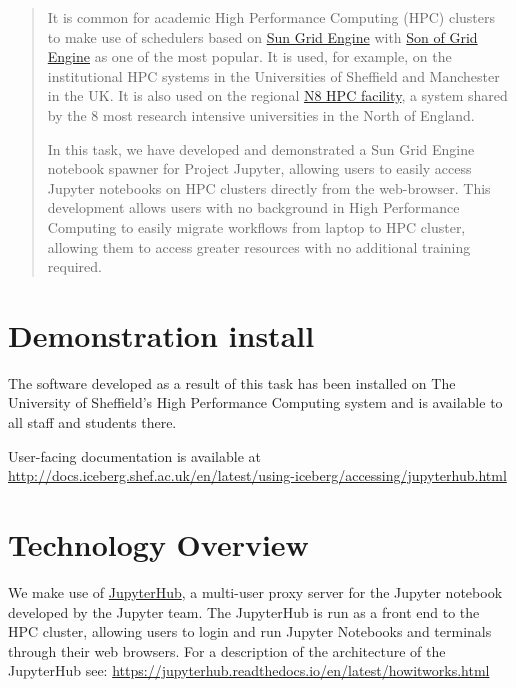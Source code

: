 \documentclass{deliverablereport}
\author{Stuart Mumford, Neil Lawrence \& Mike Croucher}
\begin{document}
\begin{abstract}
It is common for academic High Performance Computing (HPC) clusters to make use of schedulers based on \href{https://en.wikipedia.org/wiki/Oracle_Grid_Engine}{Sun Grid Engine} with \href{https://arc.liv.ac.uk/trac/SGE}{Son of Grid Engine} as one of the most popular. It is used, for example, on the institutional HPC systems in the Universities of Sheffield and Manchester in the UK. It is also used on the regional \href{http://n8hpc.org.uk/}{N8 HPC facility}, a system shared by the 8 most research intensive universities in the North of England. 

In this task, we have developed and demonstrated a Sun Grid Engine notebook spawner for Project Jupyter, allowing users to easily access Jupyter notebooks on HPC clusters directly from the web-browser. This development allows users with no background in High Performance Computing to easily migrate workflows from laptop to HPC cluster, allowing them to access greater resources with no additional training required.

\end{abstract}
\maketitle\vfill
\newpage\tableofcontents\newpage

\section{Demonstration install}

The software developed as a result of this task has been installed on The University of Sheffield's High Performance Computing system and is available to all staff and students there. 

User-facing documentation is available at \url{http://docs.iceberg.shef.ac.uk/en/latest/using-iceberg/accessing/jupyterhub.html}

\section{Technology Overview}

We make use of \href{https://github.com/jupyterhub/jupyterhub}{JupyterHub}, a multi-user proxy server for the Jupyter notebook developed by the Jupyter team.
The JupyterHub is run as a front end to the HPC cluster, allowing users to login and run Jupyter Notebooks and terminals through their web browsers. For a description of the architecture of the JupyterHub see: \url{https://jupyterhub.readthedocs.io/en/latest/howitworks.html}
\end{document}
